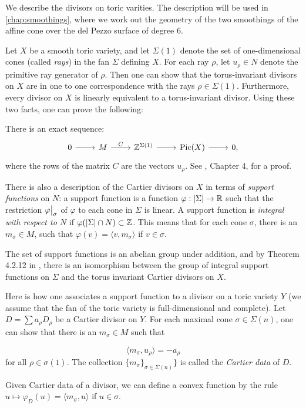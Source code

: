 We describe the divisors on toric varities. The description will be used in \cref{chap:smoothings}, where we work out the geometry of the two smoothings of the affine cone over the del Pezzo surface of degree $6$.

Let $X$ be a smooth toric variety, and let $\Sigma(1)$ denote the set of one-dimensional cones (called \emph{rays}) in the fan $\Sigma$ defining $X$. For each ray $\rho$, let $u_\rho \in N$ denote the primitive ray generator of $\rho$. Then one can show that the torus-invariant divisors on $X$ are in one to one correspondence with the rays $\rho \in \Sigma(1)$. Furthermore, every divisor on $X$ is linearly equivalent to a torus-invariant divisor. Using these two facts, one can prove the following:

There is an exact sequence:
\[
\begin{tikzcd}
0 \arrow{r} &  M \arrow{r}{C} & \Z^{\Sigma(1)}\arrow{r} & \Pic(X)   \arrow{r} & 0,
\end{tikzcd}
\]
where the rows of the matrix $C$ are the vectors $u_{\rho}$. See \cite{cox_toric}, Chapter 4, for a proof.

There is also a description of the Cartier divisors on $X$ in terms of \emph{support functions} on $N$: a support function is a function $\varphi:|\Sigma| \to \mathbb{R}$ such that the restriction $\restr{\varphi}{\sigma}$ of $\varphi$ to each cone in $\Sigma$ is linear. A support function is \emph{integral with respect to $N$} if $\varphi(|\Sigma| \cap N) \subset \mathbb{Z}$. This means that for each cone $\sigma$, there is an $m_\sigma \in M$, such that $\varphi(v)=\langle v, m_\sigma \rangle$ if $v \in \sigma$.

The set of support functions is an abelian group under addition, and by Theorem 4.2.12 in \cite{cox_toric}, there is an isomorphism between the group of integral support functions on $\Sigma$ and the torus invariant Cartier divisors on $X$.

Here is how one associates a support function to a divisor on a toric variety $Y$ (we assume that the fan of the toric variety is full-dimensional and complete). Let $D=\sum a_\rho D_\rho$ be a Cartier divisor on $Y$. For each maximal cone $\sigma \in \Sigma(n)$, one can show that there is an $m_\sigma \in M$ such that

\[
\langle m_\sigma , u_\rho \rangle = -a_\rho
\]
for all $\rho \in \sigma(1)$. The collection $\{ m_\sigma \}_{\sigma \in \Sigma(n)}\}$ is called the \emph{Cartier data} of $D$.

Given Cartier data of a divisor, we can define a convex function by the rule $u \mapsto \varphi_D(u)=\langle m_\sigma, u\rangle$ if $ u\in \sigma$. 

